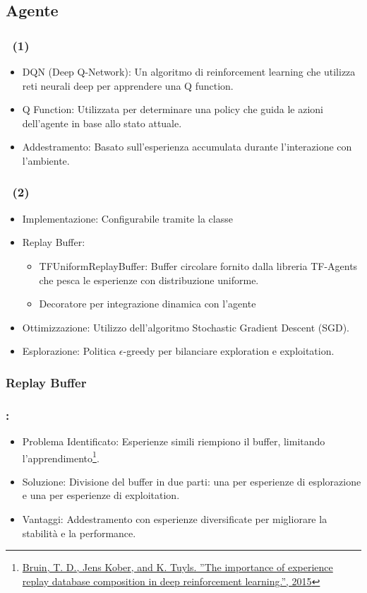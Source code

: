 \documentclass[compress]{beamer}
\begin{document}
\subsection{Agente}
\begin{frame}
    \frametitle{\subsecname\ (1)}
    \begin{itemize}
        \item DQN (Deep Q-Network): Un algoritmo di reinforcement learning che utilizza reti neurali deep per apprendere una Q function.
        \item Q Function: Utilizzata per determinare una policy che guida le azioni dell'agente in base allo stato attuale.
        \item Addestramento: Basato sull'esperienza accumulata durante l'interazione con l'ambiente.
    \end{itemize}
\end{frame}
\begin{frame}
    \frametitle{\subsecname\ (2)}
    \begin{itemize}
        \item Implementazione: Configurabile tramite la classe 
        \item Replay Buffer:
        \begin{itemize}
            \item TFUniformReplayBuffer: Buffer circolare fornito dalla libreria TF-Agents che pesca le esperienze con distribuzione uniforme.
            \item Decoratore per integrazione dinamica con l'agente
        \end{itemize}
        \item Ottimizzazione: Utilizzo dell'algoritmo Stochastic Gradient Descent (SGD).
        \item Esplorazione: Politica $\epsilon$-greedy per bilanciare exploration e exploitation.
        
    \end{itemize}
\end{frame}

\subsubsection{Replay Buffer}

\begin{frame}
    \frametitle{\subsecname: \subsubsecname}
    \begin{itemize}
        \item Problema Identificato: Esperienze simili riempiono il buffer, limitando l'apprendimento\footnote{\href{https://rll.berkeley.edu/deeprlworkshop/papers/database_composition.pdf}{ Bruin, T. D., Jens Kober, and K. Tuyls. ”The importance of experience replay database composition in deep reinforcement learning.”, 2015}}.
        \item Soluzione: Divisione del buffer in due parti: una per esperienze di esplorazione e una per esperienze di exploitation.
        \item Vantaggi: Addestramento con esperienze diversificate per migliorare la stabilità e la performance.
    \end{itemize}
\end{frame}
\end{document}
